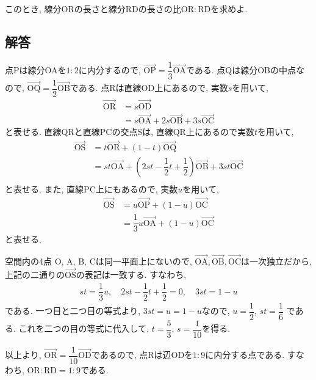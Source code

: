 \documentclass[dvipdfmx,a4paper]{jsarticle}
\newcommand{\posv}[1]{\overrightarrow{\mathrm{#1}}}
\newcommand{\2}{I\hspace{-1pt}I}
\newcommand{\3}{I\hspace{-1pt}I\hspace{-1pt}I}
\begin{document}
    このとき, 線分ORの長さと線分RDの長さの比$\mathrm{OR} : \mathrm{RD}$を求めよ. 
    \subsection{解答}
    点Pは線分OAを$1 : 2$に内分するので, $\posv{OP} = \dfrac{1}{3}\posv{OA}$である. 
    点Qは線分OBの中点なので, $\posv{OQ} = \dfrac{1}{2}\posv{OB}$である. 
    点Rは直線OD上にあるので, 実数$s$を用いて, 
    \begin{align*}
        \posv{OR} &= s \posv{OD} \\
        &= s\posv{OA} + 2s\posv{OB} + 3s\posv{OC}
    \end{align*}
    と表せる. 直線QRと直線PCの交点Sは, 直線QR上にあるので実数$t$を用いて, 
    \begin{align*}
        \posv{OS} &= t \posv{OR} + (1-t) \posv{OQ}\\
        &= st\posv{OA} + \left(2st-\dfrac{1}{2}t+\dfrac{1}{2}\right)\posv{OB} + 3st\posv{OC} \\
    \end{align*}
    と表せる. また, 直線PC上にもあるので, 実数$u$を用いて, 
    \begin{align*}
        \posv{OS} &= u \posv{OP} + (1-u) \posv{OC}\\
        &= \dfrac{1}{3}u \posv{OA} + (1-u) \posv{OC}
    \end{align*}
    と表せる. 
    
    空間内の4点 O, A, B, Cは同一平面上にないので, $\posv{OA},\posv{OB},\posv{OC}$は一次独立だから, 
    上記の二通りの$\posv{OS}$の表記は一致する. すなわち, 
    \begin{align*}
        st = \dfrac{1}{3}u, \quad 2st-\dfrac{1}{2}t+\dfrac{1}{2} = 0, \quad 3st = 1-u
    \end{align*}
    である. 一つ目と二つ目の等式より, $3st=u=1-u$なので, $u = \dfrac{1}{2}$, $st = \dfrac{1}{6}$
    である. これを二つの目の等式に代入して, $t = \dfrac{5}{3}$, $s = \dfrac{1}{10}$を得る. 

    以上より, $\posv{OR} =  \dfrac{1}{10}\posv{OD}$であるので, 点Rは辺ODを$1:9$に内分する点である. 
    すなわち, $\mathrm{OR} : \mathrm{RD} = 1:9$である. 
\end{document}
